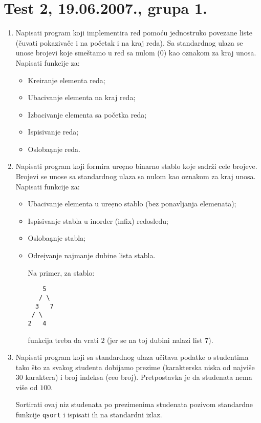 \section{Test 2, 19.06.2007., grupa 1.}


\begin{enumerate}

\item Napisati program koji implementira red pomo\' cu jednostruko
povezane liste (\v cuvati pokaziva\v ce i na po\v cetak i na kraj reda).
Sa standardnog ulaza se unose brojevi koje sme\v stamo u red sa
nulom ($0$) kao oznakom za kraj unosa.
Napisati funkcije za:

\begin{itemize}
\item Kreiranje elementa reda;
\item Ubacivanje elementa na kraj reda;
\item Izbacivanje elementa sa po\v cetka reda;
\item Ispisivanje reda;
\item Osloba\d anje reda.
\end{itemize}

\item Napisati program koji formira ure\d eno binarno stablo koje sadr\v zi
cele brojeve. Brojevi se unose sa standardnog ulaza sa nulom kao oznakom
za kraj unosa.
Napisati funkcije za:

\begin{itemize}
\item Ubacivanje elementa u ure\d eno stablo (bez ponavljanja elemenata);
\item Ispisivanje stabla u inorder (infix) redosledu;
\item Osloba\d anje stabla;
\item Odre\d ivanje najmanje dubine lista stabla.

Na primer, za stablo:

\begin{verbatim}
    5
   / \
  3   7
 / \
2   4
\end{verbatim}

funkcija treba da vrati $2$ (jer se na toj dubini nalazi list $7$).
\end{itemize}

\item Napisati program koji sa standardnog ulaza u\v citava podatke o
studentima tako \v sto za svakog studenta dobijamo prezime
(karakterska niska od najvi\v se $30$ karaktera) i broj indeksa (ceo broj).
Pretpostavka je da studenata nema vi\v se od $100$.

Sortirati ovaj niz studenata po prezimenima studenata pozivom standardne
funkcije {\tt qsort} i ispisati ih na standardni izlaz.

\end{enumerate}


